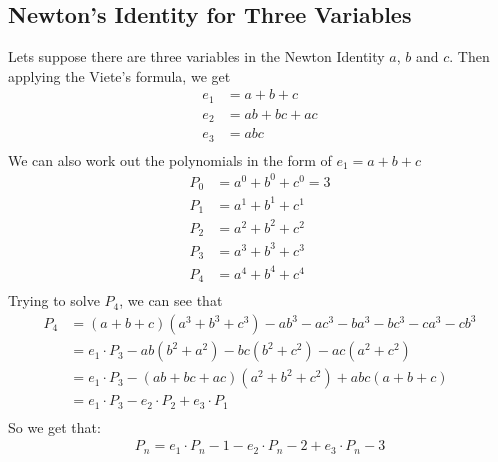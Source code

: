 \documentclass[11pt, oneside]{article}   	%
\begin{document}
\subsection{Newton's Identity for Three Variables}
Lets suppose there are three variables in the Newton Identity $a$, $b$ and $c$.
Then applying the Viete's formula, we get
\begin{align*}
e_1&=a+b+c\\
e_2&=ab+bc+ac\\
e_3&=abc\\
\end{align*} 
We can also work out  the polynomials in the form of $e_1=a+b+c$
\begin{align*}
P_0&=a^0+b^0+c^0=3\\
P_1&=a^1+b^1+c^1\\
P_2&=a^2+b^2+c^2\\
P_3&=a^3+b^3+c^3\\
P_4&=a^4+b^4+c^4\\
\end{align*} 
Trying to solve $P_4$, we can see that
\begin{align*}
P_4&=(a+b+c)(a^3+b^3+c^3)-ab^3-ac^3-ba^3-bc^3-ca^3-cb^3\\
&=e_1 \cdot P_3 -ab(b^2+a^2)-bc(b^2+c^2)-ac(a^2+c^2)\\
&=e_1 \cdot P_3 -(ab+bc+ac)(a^2+b^2+c^2)+abc(a+b+c)\\
&=e_1 \cdot P_3 - e_2 \cdot P_2 + e_3 \cdot P_1\\
\end{align*} 
So we get that:
\begin{align*}
P_n=e_1 \cdot P_n-1 - e_2 \cdot P_n-2 + e_3 \cdot P_n-3
\end{align*} 
\end{document}
